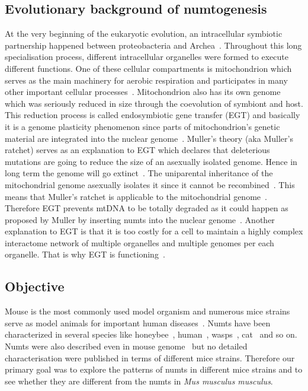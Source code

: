 \documentclass[a4paper,12pt]{article}
\numberwithin{equation}{section} %
\begin{document}
\subsection{Evolutionary background of numtogenesis}
\indent At the very beginning of the eukaryotic evolution, an intracellular symbiotic partnership happened between proteobacteria and Archea~. Throughout this long specialisation process, different intracellular organelles were formed to execute different functions. One of these cellular compartments is mitochondrion which serves as the main machinery for aerobic respiration and participates in many other important cellular processes~. Mitochondrion also has its own genome which was seriously reduced in size through the coevolution of symbiont and host. This reduction process is called endosymbiotic gene transfer (EGT) and basically it is a genome plasticity phenomenon since parts of mitochondrion's genetic material are integrated into the nuclear genome~. Muller's theory (aka Muller's ratchet) serves as an explanation to EGT which declares that deleterious mutations are going to reduce the size of an asexually isolated genome. Hence in long term the genome will go extinct~. The uniparental inheritance of the mitochondrial genome asexually isolates it since it cannot be recombined~. This means that Muller's ratchet is applicable to the mitochondrial genome~. Therefore EGT prevents mtDNA to be totally degraded as it could happen as proposed by Muller by inserting numts into the nuclear genome~. Another explanation to EGT is that it is too costly for a cell to maintain a highly complex interactome network of multiple organelles and multiple genomes per each organelle. That is why EGT is functioning~.

\subsection{Objective}
\indent Mouse is the most commonly used model organism and numerous mice strains serve as model animals for important human diseases~. Numts have been characterized in several species like honeybee~, human~, wasps~, cat~ and so on. Numts were also described even in mouse genome~ but no detailed characterisation were published in terms of different mice strains. Therefore our primary goal was to explore the patterns of numts in different mice strains and to see whether they are different from the numts in \textit{Mus musculus musculus}.
\end{document}
